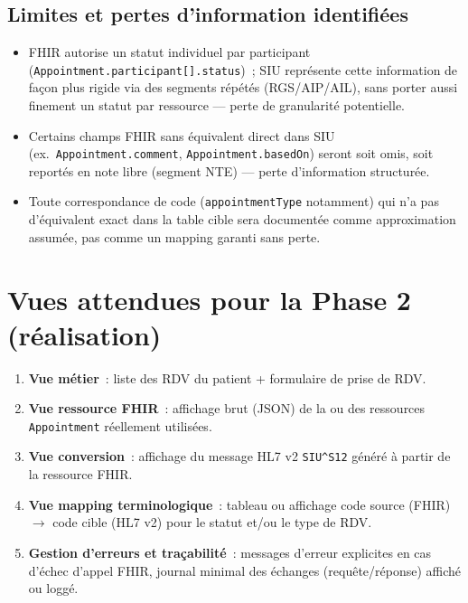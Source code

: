 \documentclass[11pt,a4paper]{article}
\newcommand{\siu}{SIU\textasciicircum{}S12}
\begin{document}
\subsection*{Limites et pertes d'information identifi\'ees}
\begin{itemize}[leftmargin=1.2cm]
  \item FHIR autorise un statut individuel par participant (\texttt{Appointment.\allowbreak participant[].\allowbreak status})~; SIU repr\'esente cette information de fa\c{c}on plus rigide via des segments r\'ep\'et\'es (RGS/AIP/AIL), sans porter aussi finement un statut par ressource --- perte de granularit\'e potentielle.
  \item Certains champs FHIR sans \'equivalent direct dans SIU (ex.\ \texttt{Appointment.\allowbreak comment}, \texttt{Appointment.\allowbreak basedOn}) seront soit omis, soit report\'es en note libre (segment NTE) --- perte d'information structur\'ee.
  \item Toute correspondance de code (\texttt{appointmentType} notamment) qui n'a pas d'\'equivalent exact dans la table cible sera document\'ee comme approximation assum\'ee, pas comme un mapping garanti sans perte.
\end{itemize}

\section{Vues attendues pour la Phase 2 (r\'ealisation)}

\begin{enumerate}[leftmargin=1.2cm]
  \item \textbf{Vue m\'etier}~: liste des RDV du patient + formulaire de prise de RDV.
  \item \textbf{Vue ressource FHIR}~: affichage brut (JSON) de la ou des ressources \texttt{Appointment} r\'eellement utilis\'ees.
  \item \textbf{Vue conversion}~: affichage du message HL7 v2 \texttt{\siu} g\'en\'er\'e \`a partir de la ressource FHIR.
  \item \textbf{Vue mapping terminologique}~: tableau ou affichage code source (FHIR) $\rightarrow$ code cible (HL7 v2) pour le statut et/ou le type de RDV.
  \item \textbf{Gestion d'erreurs et tra\c{c}abilit\'e}~: messages d'erreur explicites en cas d'\'echec d'appel FHIR, journal minimal des \'echanges (requ\^ete/r\'eponse) affich\'e ou logg\'e.
\end{enumerate}
\end{document}
